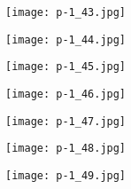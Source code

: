 \clearpage


\begin{figure}
    \begin{center}
        \texttt{[image: p-1\_43.jpg]}
        \caption{}
    \end{center}
\end{figure}

\clearpage


\begin{figure}
    \begin{center}
        \texttt{[image: p-1\_44.jpg]}
        \caption{}
    \end{center}
\end{figure}

\clearpage


\begin{figure}
    \begin{center}
        \texttt{[image: p-1\_45.jpg]}
        \caption{}
    \end{center}
\end{figure}

\clearpage


\begin{figure}
    \begin{center}
        \texttt{[image: p-1\_46.jpg]}
        \caption{}
    \end{center}
\end{figure}

\clearpage


\begin{figure}
    \begin{center}
        \texttt{[image: p-1\_47.jpg]}
        \caption{}
    \end{center}
\end{figure}

\clearpage


\begin{figure}
    \begin{center}
        \texttt{[image: p-1\_48.jpg]}
        \caption{}
    \end{center}
\end{figure}

\clearpage


\begin{figure}
    \begin{center}
        \texttt{[image: p-1\_49.jpg]}
        \caption{}
    \end{center}
\end{figure}

